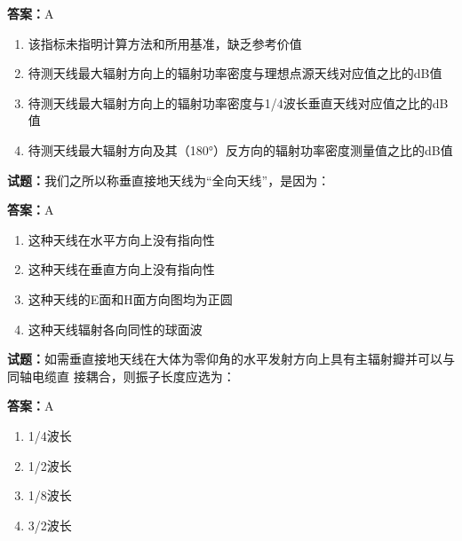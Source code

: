 \documentclass{ctexbook}
\begin{document}
\textbf{答案：}A 

\begin{enumerate}[leftmargin=3em]
  \item 该指标未指明计算方法和所用基准，缺乏参考价值 

  \item 待测天线最大辐射方向上的辐射功率密度与理想点源天线对应值之比的dB值 

  \item 待测天线最大辐射方向上的辐射功率密度与1/4波长垂直天线对应值之比的dB值 

  \item 待测天线最大辐射方向及其（180°）反方向的辐射功率密度测量值之比的dB值 

\end{enumerate}





\vspace{1em}

\textbf{试题：}我们之所以称垂直接地天线为“全向天线”，是因为： 

\textbf{答案：}A 

\begin{enumerate}[leftmargin=3em]
  \item 这种天线在水平方向上没有指向性 

  \item 这种天线在垂直方向上没有指向性 

  \item 这种天线的E面和H面方向图均为正圆 

  \item 这种天线辐射各向同性的球面波 

\end{enumerate}





\vspace{1em}

\textbf{试题：}如需垂直接地天线在大体为零仰角的水平发射方向上具有主辐射瓣并可以与同轴电缆直
接耦合，则振子长度应选为： 

\textbf{答案：}A 

\begin{enumerate}[leftmargin=3em]
  \item 1/4波长 

  \item 1/2波长 

  \item 1/8波长 

  \item 3/2波长 

\end{enumerate}
\end{document}
